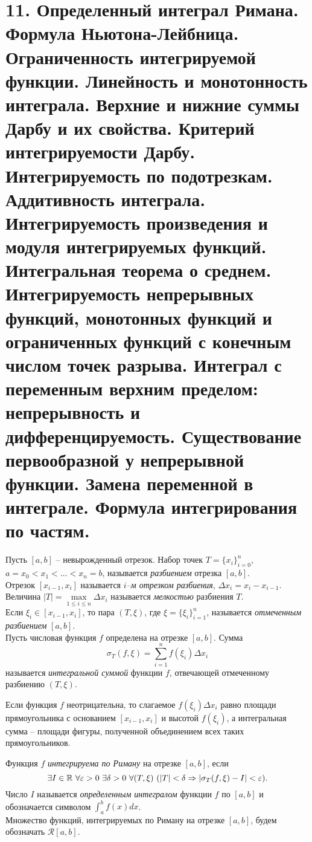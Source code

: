 \section{11. Определенный интеграл Римана. Формула Ньютона-Лейбница. Ограниченность интегрируемой функции. Линейность и монотонность интеграла. Верхние и нижние суммы Дарбу и их свойства. Критерий интегрируемости Дарбу. Интегрируемость по подотрезкам. Аддитивность интеграла. Интегрируемость произведения и модуля интегрируемых функций. Интегральная теорема о среднем. Интегрируемость непрерывных функций, монотонных функций и ограниченных функций с конечным числом точек разрыва. Интеграл с переменным верхним пределом: непрерывность и дифференцируемость. Существование первообразной у непрерывной функции. Замена переменной в интеграле. Формула интегрирования по частям.}

    \begin{definition}
        Пусть $[a, b]$ -- невырожденный отрезок. Набор точек $T = \{x_{i}\}_{i=0}^{n}$, $a = x_{0} < x_{1} < \dots < x_{n} = b$, называется \textit{разбиением} отрезка $[a, b]$.\\
        Отрезок $[x_{i-1}, x_{i}]$ называется \textit{$i$--м отрезком разбиения}, $\Delta x_{i} = x_{i} - x_{i-1}$. Величина $|T| = \underset{1 \leq i \leq n}{\max} \Delta x_{i}$ называется \textit{мелкостью} разбиения $T$.\\
        Если $\xi_{i} \in [x_{i-1}, x_{i}]$, то пара $(T, \xi)$, где $\xi = \{\xi_{i}\}_{i=1}^{n}$, называется \textit{отмеченным разбиением} $[a, b]$.\\
        Пусть числовая функция $f$ определена на отрезке $[a, b]$. Сумма
        \[\sigma_{T}(f, \xi) = \sum_{i=1}^{n} f(\xi_{i}) \Delta x_{i}\]
        называется \textit{интегральной суммой} функции $f$, отвечающей отмеченному разбиению $(T, \xi)$.
    \end{definition}

    Если функция $f$ неотрицательна, то слагаемое $f(\xi_{i}) \Delta x_{i}$ равно площади прямоугольника с основанием $[x_{i-1}, x_{i}]$ и высотой $f(\xi_{i})$, а интегральная сумма -- площади фигуры, полученной объединением всех таких прямоугольников.

    \begin{definition}
        Функция $f$ \textit{интегрируема по Риману} на отрезке $[a, b]$, если
        \[\exists I \in \mathbb{R} \ \forall \varepsilon > 0 \ \exists \delta > 0 \ \forall (T, \xi) \ (|T| < \delta \Rightarrow |\sigma_{T}(f, \xi) - I| < \varepsilon).\]
        Число $I$ называется \textit{определенным интегралом} функции $f$ по $[a, b]$ и обозначается символом $\int_{a}^{b} f(x) dx$.\\
        Множество функций, интегрируемых по Риману на отрезке $[a, b]$, будем обозначать $\mathcal{R}[a, b]$.
    \end{definition}


